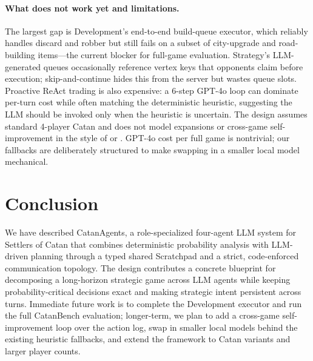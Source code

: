\documentclass{article} %
\begin{document}
\paragraph{What does not work yet and limitations.} The largest gap is Development's end-to-end build-queue executor, which reliably handles discard and robber but still fails on a subset of city-upgrade and road-building items---the current blocker for full-game evaluation. Strategy's LLM-generated queues occasionally reference vertex keys that opponents claim before execution; skip-and-continue hides this from the server but wastes queue slots. Proactive ReAct trading is also expensive: a 6-step GPT-4o loop can dominate per-turn cost while often matching the deterministic heuristic, suggesting the LLM should be invoked only when the heuristic is uncertain. The design assumes standard 4-player Catan and does not model expansions or cross-game self-improvement in the style of \citet{wang2023voyager} or \citet{belle2025agentsofchange}. GPT-4o cost per full game is nontrivial; our fallbacks are deliberately structured to make swapping in a smaller local model mechanical.

\section{Conclusion}
\label{sec:conclusion}

We have described CatanAgents, a role-specialized four-agent LLM system for Settlers of Catan that combines deterministic probability analysis with LLM-driven planning through a typed shared Scratchpad and a strict, code-enforced communication topology. The design contributes a concrete blueprint for decomposing a long-horizon strategic game across LLM agents while keeping probability-critical decisions exact and making strategic intent persistent across turns. Immediate future work is to complete the Development executor and run the full CatanBench evaluation; longer-term, we plan to add a cross-game self-improvement loop over the action log, swap in smaller local models behind the existing heuristic fallbacks, and extend the framework to Catan variants and larger player counts.
\end{document}
